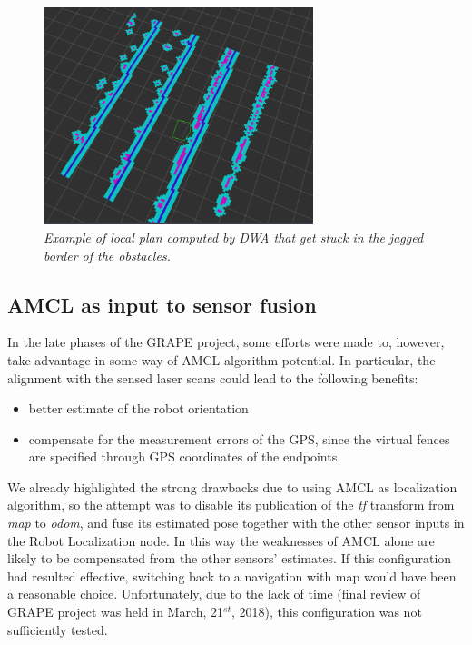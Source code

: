 \begin{figure}
	\centering
	\includegraphics[width=0.7\textwidth]{Images/localization/localCostmap_stuck.png}
	\caption{\textit{Example of local plan computed by DWA that get stuck in the jagged border of the obstacles.}}
	\label{fig:dwaStuck}
\end{figure}

\subsection{AMCL as input to sensor fusion}\label{subsec:AMCLinSensorFusion}
In the late phases of the \ac{GRAPE} project, some efforts were made to, however, take advantage in some way of \ac{AMCL} algorithm potential. In particular, the alignment with the sensed laser scans could lead to the following benefits:
\begin{itemize}
	\item better estimate of the robot orientation 
	\item compensate for the measurement errors of the GPS, since the virtual fences are specified through GPS coordinates of the endpoints
\end{itemize}

We already highlighted the strong drawbacks due to using \ac{AMCL} as localization algorithm, so the attempt was to disable its publication of the \textit{tf} transform from \textit{map} to \textit{odom}, and fuse its estimated pose together with the other sensor inputs in the Robot Localization node. In this way the weaknesses of \ac{AMCL} alone are likely to be compensated from the other sensors' estimates. If this configuration had resulted effective, switching back to a navigation with map would have been a reasonable choice. Unfortunately, due to the lack of time (final review of \ac{GRAPE} project was held in March, 21$^{st}$, 2018), this configuration was not sufficiently tested. 

